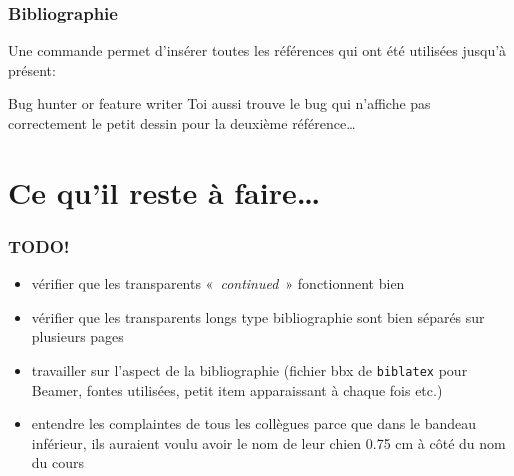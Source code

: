 \documentclass{beamer}
\begin{document}
\begin{frame}
\frametitle{Bibliographie}

Une commande permet d'insérer toutes les références qui ont été
utilisées jusqu'à présent:

\nocite{mittelbach04:_latex}

\biblio{}

\pause

\begin{block}{Bug hunter or feature writer}
  Toi aussi trouve le bug qui n'affiche pas correctement le petit
  dessin pour la deuxième référence\ldots
\end{block}

\end{frame}

\section{Ce qu'il reste à faire\ldots}
\label{sec:todo}

\begin{frame}
\frametitle{TODO!}

\begin{itemize}
\item vérifier que les transparents «~\textit{continued}~»
  fonctionnent bien
\item vérifier que les transparents longs type bibliographie sont bien
  séparés sur plusieurs pages
\item travailler sur l'aspect de la bibliographie (fichier bbx de
  \texttt{biblatex} pour Beamer, fontes utilisées, petit item
  apparaissant à chaque fois etc.)
\item entendre les complaintes de tous les collègues parce que dans le
  bandeau inférieur, ils auraient voulu avoir le nom de leur chien
  0.75 cm à côté du nom du cours \smiley

\end{itemize}

\end{frame}
\end{document}
